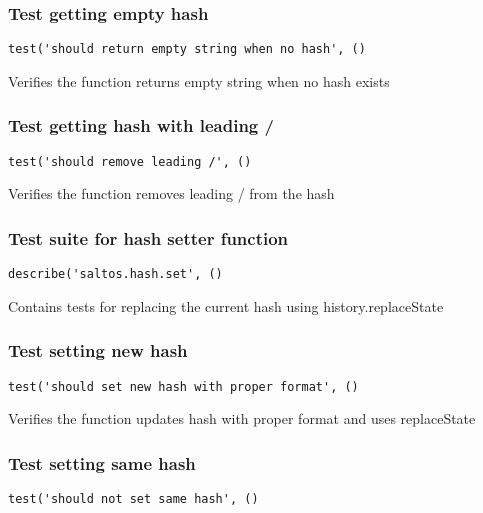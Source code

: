 \documentclass[a4paper]{article}
\begin{document}
\subsubsection{Test getting empty hash}

\begin{lstlisting}
test('should return empty string when no hash', ()
\end{lstlisting}

Verifies the function returns empty string when no hash exists

\hypertarget{toc201}{}
\subsubsection{Test getting hash with leading /}

\begin{lstlisting}
test('should remove leading /', ()
\end{lstlisting}

Verifies the function removes leading / from the hash

\hypertarget{toc202}{}
\subsubsection{Test suite for hash setter function}

\begin{lstlisting}
describe('saltos.hash.set', ()
\end{lstlisting}

Contains tests for replacing the current hash
using history.replaceState

\hypertarget{toc203}{}
\subsubsection{Test setting new hash}

\begin{lstlisting}
test('should set new hash with proper format', ()
\end{lstlisting}

Verifies the function updates hash with proper format
and uses replaceState

\hypertarget{toc204}{}
\subsubsection{Test setting same hash}

\begin{lstlisting}
test('should not set same hash', ()
\end{lstlisting}
\end{document}
